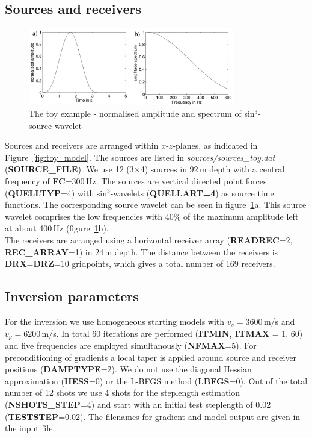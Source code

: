 \subsection{Sources and receivers}
\begin{figure}[h!]
\begin{center}
\includegraphics[width=0.8\textwidth]{fig_toy/source_toy}
\caption[Toy example - source wavelet and spectrum]{The toy example - normalised amplitude and spectrum of sin$^3$-source wavelet }\label{fig:toy_wavelet}
\end{center}
\end{figure}
Sources and receivers are arranged within $x$-$z$-planes, as indicated in Figure~\ref{fig:toy_model}. The sources are listed in \textit{sources/sources\_toy.dat} (\textbf{SOURCE\_FILE}). We use 12 (3$\times$4) sources in 92\,m depth with a central frequency of \textbf{FC}=300\,Hz. The sources are vertical directed point forces (\textbf{QUELLTYP}=4) with sin$^3$-wavelets (\textbf{QUELLART=4}) as source time functions. The corresponding source wavelet can be seen in figure~\ref{fig:toy_wavelet}a. This source wavelet comprises the low frequencies with $40\%$ of the maximum amplitude left at about 400\,Hz (figure~\ref{fig:toy_wavelet}b). \\
The receivers are arranged using a horizontal receiver array (\textbf{READREC}=2, \textbf{REC\_ARRAY}=1) in 24\,m depth. The distance between the receivers is \textbf{DRX}=\textbf{DRZ}=10 gridpoints, which gives a total number of 169 receivers. 
\subsection{Inversion parameters}
For the inversion we use homogeneous starting models with $v_s=3600$\,m/s and $v_p=6200$\,m/s. In total 60 iterations are performed (\textbf{ITMIN, ITMAX }= 1, 60) and five frequencies are employed simultanously (\textbf{NFMAX}=5). For preconditioning of gradients a local taper is applied around source and receiver positions (\textbf{DAMPTYPE}=2). We do not use the diagonal Hessian approximation (\textbf{HESS}=0) or the L-BFGS method (\textbf{LBFGS}=0). Out of the total number of 12 shots we use 4 shots for the steplength estimation (\textbf{NSHOTS\_STEP}=4) and start with an initial test steplength of 0.02 (\textbf{TESTSTEP}=0.02). The filenames for gradient and model output are given in the input file.
